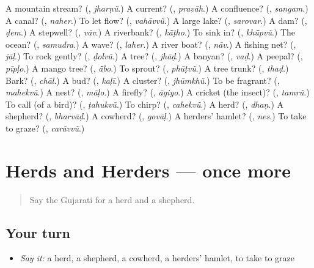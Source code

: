 \begin{tcolorbox}[breakable,colback=teal!4,colframe=teal!35!black,title={Before you move on}]
A mountain stream? (\textbf{}, \emph{jharṇũ}.) A current? (\textbf{}, \emph{pravāh}.) A confluence? (\textbf{}, \emph{sangam}.) A canal? (\textbf{}, \emph{naher}.) To let flow? (\textbf{}, \emph{vahāvvũ}.) A large lake? (\textbf{}, \emph{sarovar}.) A dam? (\textbf{}, \emph{ḍem}.) A stepwell? (\textbf{}, \emph{vāv}.) A riverbank? (\textbf{}, \emph{kā̃ṭho}.) To sink in? (\textbf{}, \emph{khū̃pvũ}.) The ocean? (\textbf{}, \emph{samudra}.) A wave? (\textbf{}, \emph{laher}.) A river boat? (\textbf{}, \emph{nāv}.) A fishing net? (\textbf{}, \emph{jāḷ}.) To rock gently? (\textbf{}, \emph{ḍolvũ}.) A tree? (\textbf{}, \emph{jhāḍ}.) A banyan? (\textbf{}, \emph{vaḍ}.) A peepal? (\textbf{}, \emph{pīpḷo}.) A mango tree? (\textbf{}, \emph{ā̃bo}.) To sprout? (\textbf{}, \emph{phūṭvũ}.) A tree trunk? (\textbf{}, \emph{thaḍ}.) Bark? (\textbf{}, \emph{chāl}.) A bud? (\textbf{}, \emph{kaḷī}.) A cluster? (\textbf{}, \emph{jhūmkhũ}.) To be fragrant? (\textbf{}, \emph{mahekvũ}.) A nest? (\textbf{}, \emph{māḷo}.) A firefly? (\textbf{}, \emph{āgiyo}.) A cricket (the insect)? (\textbf{}, \emph{tamrũ}.) To call (of a bird)? (\textbf{}, \emph{ṭahukvũ}.) To chirp? (\textbf{}, \emph{cahekvũ}.) A herd? (\textbf{}, \emph{dhaṇ}.) A shepherd? (\textbf{}, \emph{bharvāḍ}.) A cowherd? (\textbf{}, \emph{govāḷ}.) A herders' hamlet? (\textbf{}, \emph{nes}.) To take to graze? (\textbf{}, \emph{carāvvũ}.)
\end{tcolorbox}
\section[(dialogue)]{Herds and Herders — once more}

\label{lesson:GU-R446-review-final-446}



\begin{quote}
Say the Gujarati for a herd and a shepherd.
\end{quote}

\subsection*{Your turn}
\begin{itemize}
\raggedright
  \item \emph{Say it:} a herd, a shepherd, a cowherd, a herders' hamlet, to take to graze
\end{itemize}

